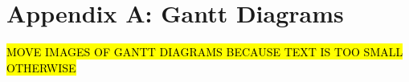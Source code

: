 \renewcommand\thechapter{A}
\chapter{Appendix A: Gantt Diagrams}
\label{AppendixA}

\hl{MOVE IMAGES OF GANTT DIAGRAMS BECAUSE TEXT IS TOO SMALL OTHERWISE}